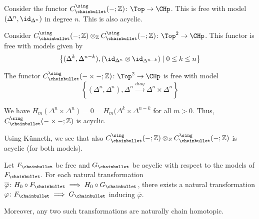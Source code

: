 \begin{example}
  Consider the functor
  $C_\chainbullet ^{\sing}(\blank ; \mathbb{Z})\colon \Top \to \CHp$.
  This is free with model $(\Delta^n, \id_{\Delta^n})$ in degree $n$.
  This is also acyclic.
\end{example}

\begin{example}
  Consider
  $C_\chainbullet ^{\sing}(\blank ; \mathbb{Z}) \otimes _{\mathbb{Z}} C_\chainbullet ^{\sing}
  (\blank ; \mathbb{Z}) \colon  \Top^2 \to  \CHp$.
  This functor is free with models given by
  \[
    \left\{(\Delta^k, \Delta^{n-k}), (\id_{\Delta^n} \otimes \id_{\Delta^{n-k}}) 
    \mid  0 \leq  k \leq  n\right\} 
  \]

  The functor $C_{\chainbullet}^{\sing}(\blank \times  \blank ; \mathbb{Z}) \colon  \Top^2\to \CHp$
  is free with model
  \[
    \left\{(\Delta^n, \Delta^n), \Delta^n \xrightarrow{diag} \Delta^n \times \Delta^n \right\} 
  \]

  We have $H_m(\Delta^n \times \Delta^n) = 0 = H_m(\Delta^k \times \Delta^{n-k}$ 
  for all $m>0$.
  Thus,  $C_{\chainbullet}^{\sing}(- \times - ; \mathbb{Z})$ is acyclic.

  Using Künneth, we see that also
  $C_{\chainbullet}^{\sing}( \blank ; \mathbb{Z}) \otimes _Z C_{\chainbullet}^{\sing} (\blank ; \mathbb{Z})$ 
  is acyclic (for both models).
\end{example}

\begin{theorem}
  \label{thm:natural-transformation-of-chain-functors-induced-on-h0}
  Let $F_{\chainbullet}$ be free and  $G_{\chainbullet}$ be acyclic
  with respect to the models of $F_\chainbullet $.
  For each natural transformation
  $\overline{\varphi } \colon  H_0 \circ  F_{\chainbullet}
  \implies H_0 \circ  G_{\chainbullet}$,
  there exists a natural transformation $\varphi \colon F_{\chainbullet} \implies G_{\chainbullet}$
  inducing $\overline{\varphi }$.

  Moreover, any two such transformations are naturally chain homotopic.
\end{theorem}


